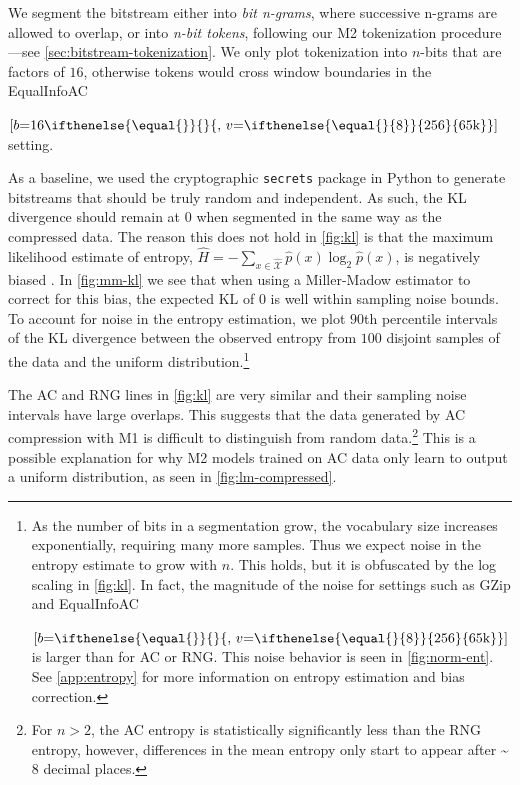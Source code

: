 We segment the bitstream either into \textit{bit n-grams}, where successive n-grams are allowed to overlap, or into \textit{n-bit tokens}, following our M2 tokenization procedure---see \ref{sec:bitstream-tokenization}. We only plot tokenization into $n$-bits that are factors of $16$, otherwise tokens would cross window boundaries in the EqualInfoAC

  {$[b\mathord{=}16\ifthenelse{\equal{}}{}{,\,v\mathord{=}\ifthenelse{\equal{}{8}}{256}{65\text{k}}}]$} setting.

As a baseline, we used the cryptographic \texttt{secrets} package in Python to generate bitstreams that should be truly random and independent. As such, the KL divergence should remain at $0$ when segmented in the same way as the compressed data. The reason this does not hold in \ref{fig:kl} is that the maximum likelihood estimate of entropy, $\hat{H} = -\sum_{x \in \hat{\mathcal{X}}} \hat{p}(x)\log_2\hat{p}(x)$, is negatively biased \cite{paninskiEstimationEntropyMutual2003}. In \ref{fig:mm-kl} we see that when using a Miller-Madow estimator \cite{millerNoteBiasInformation1955} to correct for this bias, the expected KL of $0$ is well within sampling noise bounds. To account for noise in the entropy estimation, we plot $90$th percentile intervals of the KL divergence between the observed entropy from $100$ disjoint samples of the data and the uniform distribution.\footnote{As the number of bits in a segmentation grow, the vocabulary size increases exponentially, requiring many more samples. Thus we expect noise in the entropy estimate to grow with $n$. This holds, but it is obfuscated by the log scaling in \ref{fig:kl}. In fact, the magnitude of the noise for settings such as GZip\ifthenelse{\equal{}}{}{$[v\mathord{=}\ifthenelse{\equal{}{8}}{256}{65\text{k}}]$} and EqualInfoAC
\ifthenelse{
    \equal{} \AND \equal{}
  }

  {$[b\mathord{=}\ifthenelse{\equal{}}{}{,\,v\mathord{=}\ifthenelse{\equal{}{8}}{256}{65\text{k}}}]$} is larger than for AC or RNG. This noise behavior is seen in \ref{fig:norm-ent}. See \ref{app:entropy} for more information on entropy estimation and bias correction.}

The AC and RNG lines in \ref{fig:kl} are very similar and their sampling noise intervals have large overlaps. This suggests that the data generated by AC compression with M1 is difficult to distinguish from random data.\footnote{For $n>2$, the AC entropy is statistically significantly less than the RNG entropy, however, differences in the mean entropy only start to appear after \textasciitilde{}$8$ decimal places.} This is a possible explanation for why M2 models trained on AC data only learn to output a uniform distribution, as seen in \ref{fig:lm-compressed}.

